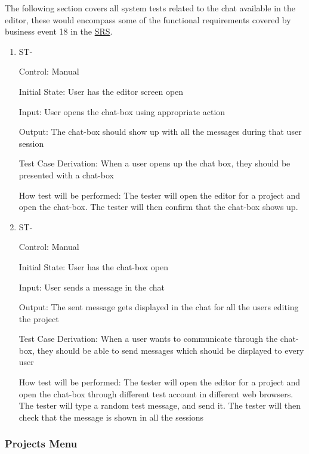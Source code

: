 \documentclass[12pt, titlepage]{article}
\newcounter{TESTID}
\newcommand\TESTNUM{\stepcounter{TESTID}\theTESTID}
\begin{document}
	The following section covers all system tests related to the chat available in the editor, these would encompass some of the functional requirements covered by business event 18 in the \href{https://github.com/RutheniumVI/UnderTree/blob/main/docs/SRS/SRS.pdf}{SRS}.
	
	\begin{enumerate}
		\item{ST-\TESTNUM\\}
		
		Control: Manual
		
		Initial State: User has the editor screen open
		
		Input: User opens the chat-box using appropriate action
		
		Output: The chat-box should show up with all the messages during that user session
		
		Test Case Derivation: When a user opens up the chat box, they should be presented with a chat-box
		
		How test will be performed: The tester will open the editor for a project and open the chat-box. The tester will then confirm that the chat-box shows up.
		
		\item{ST-\TESTNUM\\}
		
		Control: Manual
		
		Initial State: User has the chat-box open
		
		Input: User sends a message in the chat
		
		Output: The sent message gets displayed in the chat for all the users editing the project
		
		Test Case Derivation: When a user wants to communicate through the chat-box, they should be able to send messages which should be displayed to every user
		
		How test will be performed: The tester will open the editor for a project and open the chat-box through different test account in different web browsers. The tester will type a random test message, and send it. The tester will then check that the message is shown in all the sessions
		
	\end{enumerate}
	
	\subsubsection{Projects Menu}
	
\end{document}
